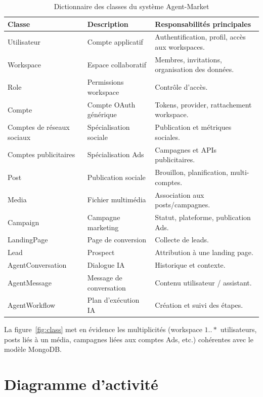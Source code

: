 \documentclass[12pt,a4paper]{report}
\numberwithin{figure}{chapter}
\numberwithin{table}{chapter}
\begin{document}
\begin{table}[H]
\centering
\caption{Dictionnaire des classes du système Agent-Market}
\label{tab:classes}
\renewcommand{\arraystretch}{1.55}
\setlength{\tabcolsep}{8pt}
\begin{tabular}{|p{}|p{}|p{}|}
\hline
\textbf{Classe} & \textbf{Description} & \textbf{Responsabilités principales} \\
\hline
Utilisateur & Compte applicatif & Authentification, profil, accès aux workspaces. \\
\hline
Workspace & Espace collaboratif & Membres, invitations, organisation des données. \\
\hline
Role & Permissions workspace & Contrôle d’accès. \\
\hline
Compte & Compte OAuth générique & Tokens, provider, rattachement workspace. \\
\hline
Comptes de réseaux sociaux & Spécialisation sociale & Publication et métriques sociales. \\
\hline
Comptes publicitaires & Spécialisation Ads & Campagnes et APIs publicitaires. \\
\hline
Post & Publication sociale & Brouillon, planification, multi-comptes. \\
\hline
Media & Fichier multimédia & Association aux posts/campagnes. \\
\hline
Campaign & Campagne marketing & Statut, plateforme, publication Ads. \\
\hline
LandingPage & Page de conversion & Collecte de leads. \\
\hline
Lead & Prospect & Attribution à une landing page. \\
\hline
AgentConversation & Dialogue IA & Historique et contexte. \\
\hline
AgentMessage & Message de conversation & Contenu utilisateur / assistant. \\
\hline
AgentWorkflow & Plan d’exécution IA & Création et suivi des étapes. \\
\hline
\end{tabular}
\renewcommand{\arraystretch}{1.0}
\end{table}

La figure~\ref{fig:class} met en évidence les multiplicités (workspace $1..*$ utilisateurs, posts liés à un média, campagnes liées aux comptes Ads, etc.) cohérentes avec le modèle MongoDB.


\section{Diagramme d’activité}
\end{document}
